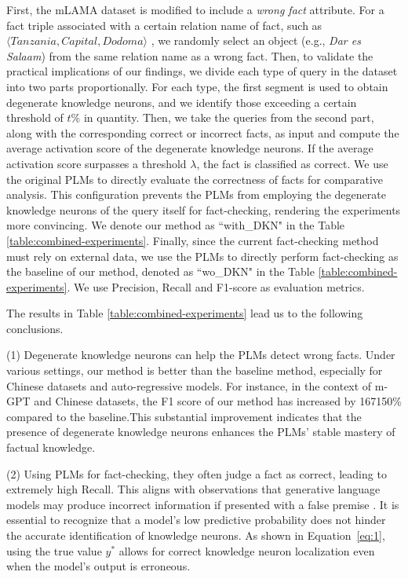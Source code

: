 \documentclass[]{article}
\newcommand{\vpara}[1]{\vspace{0.05in}\noindent\textbf{#1 }}
\begin{document}
 First, the mLAMA dataset is modified to include a \textit{wrong fact} attribute.
 For a fact triple associated with a certain relation name of fact, such as $\langle \textit{Tanzania}, \textit{Capital}, \textit{Dodoma} \rangle$ , we randomly select an object (e.g., \textit{Dar es Salaam}) from the same relation name as a wrong fact. 
Then, to validate the practical implications of our findings, we divide each type of query in the dataset into two parts proportionally. For each type, the first segment is used to obtain degenerate knowledge neurons, and we identify those exceeding a certain threshold of \( t\% \) in quantity.
Then, we take the queries from the second part, along with the corresponding correct or incorrect facts, as input and compute the average activation score of the degenerate knowledge neurons. If the average activation score surpasses a threshold $\lambda$, the fact is classified as correct.
We use the original PLMs to directly evaluate the correctness of facts for comparative analysis. This configuration prevents the PLMs from employing the degenerate knowledge neurons of the query itself for fact-checking, rendering the experiments more convincing. We denote our method as ``with\_DKN" in the Table \ref{table:combined-experiments}.
Finally, since the current fact-checking method must rely on external data, we use the PLMs to directly perform fact-checking as the baseline of our method, denoted as ``wo\_DKN" in the Table \ref{table:combined-experiments}. We use Precision, Recall and F1-score as evaluation metrics.

The results in Table \ref{table:combined-experiments} lead us to the following conclusions.

(1) Degenerate knowledge neurons can help the PLMs detect wrong facts. Under various settings, our method is better than the baseline method, especially for Chinese datasets and auto-regressive models. For instance, in the context of m-GPT and Chinese datasets, the F1 score of our method has increased by 167150\% compared to the baseline.This substantial improvement indicates that the presence of degenerate knowledge neurons enhances the PLMs' stable mastery of factual knowledge. 

(2) Using PLMs for fact-checking, they often judge a fact as correct, leading to extremely high Recall. This aligns with observations that generative language models may produce incorrect information if presented with a false premise \cite{hallucination_chatgpt3, lakshmanan2022large, metz2022new}.
It is essential to recognize that a model's low predictive probability does not hinder the accurate identification of knowledge neurons. As shown in Equation~\ref{eq:1}, using the true value \( y^* \) allows for correct knowledge neuron localization even when the model's output is erroneous.
\end{document}
